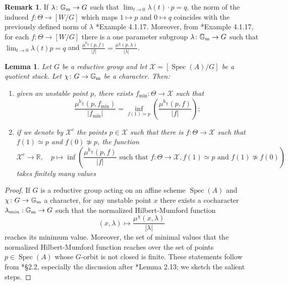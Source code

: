 \documentclass{amsart}
\newcommand{\bG}{\mathbb{G}}
\newcommand{\cX}{\mathcal{X}}
\newcommand{\spec}{\operatorname{Spec}}
\newcommand{\Gm}{\bG_{{\rm m}}}
\newtheorem{Lemma}[theorem]{Lemma}
\theoremstyle{definition}
\newtheorem{Remark}[theorem]{Remark}
\theoremstyle{definition}
\begin{document}
{\begin{Remark}\label{remark_norm_on_maps_from_theta_has_same_info_as_norm_from_1ps}
    If $\lambda\colon \Gm \to G$ such that $\lim_{t\to 0}\lambda(t)\cdot p=q$, the norm of the induced $f\colon\Theta\to [W/G]$ which maps $1\mapsto p$ and $0\mapsto q$ coincides with the previously defined norm of $\lambda$ \cite{HalInst}*{Example 4.1.17}. Moreover, from \cite{HalInst}*{Example 4.1.17}, for each $f\colon\Theta\to [W/G]$ there is a one parameter subgroup $\lambda\colon\Gm\to G$ such that $\lim_{t\to 0}\lambda(t)p = q$ and $\frac{\mu^{\Bbbk_\chi}(p,f)}{|f|} = \frac{\mu^{\chi}(p,\lambda)}{|\lambda|}$.
\end{Remark} 
 \begin{Lemma}\label{lm:bounded}
     Let $G$ be a reductive group and let $\cX=[\spec(A)/G]$ be a quotient stack. Let $\chi\colon G\to \Gm$ be a character.
     Then:
     \begin{enumerate}
         \item given an unstable point $p$, there exists $f_{\min}\colon\Theta\to\cX$ such that
         \[\frac{\mu^{\Bbbk_\chi}(p,f_{\min})}{|f_{\min}|} = \inf_{f(1)\simeq p} \left(\frac{\mu^{\Bbbk_\chi}(p,f)}{|f|}\right);\]
         \item  if we denote by $\cX^c$ the points $p\in \cX$ such that there is $f:\Theta\to \cX$ such that $f(1)\simeq p$ and $f(0)\not \simeq p$, the function \[\cX^c\to \mathbb{R},\quad p\mapsto \inf\left(\frac{\mu^{\Bbbk_\chi}(p,f)}{|f|}\text{ such that } f:\Theta\to \cX, f(1)\simeq p\text{ and }f(1)\not \simeq f(0)\right)\] takes finitely many values
     \end{enumerate}
 \end{Lemma}
 \begin{proof}
     If $G$ is a reductive group acting on an affine scheme $\spec(A)$ and $\chi\colon G\to\Gm$ a character, for any unstable point $x$ there exists a cocharacter $\lambda_{min}:\Gm\to G$ such that the normalized Hilbert-Mumford function
    \[ (x,\lambda) \longmapsto \frac{\mu^{\chi}(x,\lambda)}{|\lambda|} \]
    reaches its minimum value.
    Moreover, the set of minimal values that the normalized Hilbert-Mumford function reaches over the set of points $p\in \spec(A)$ whose $G$-orbit is not closed is finite. These statements follow from \cite{Hos}*{\S 2.2}, especially the discussion after \cite{Hos}*{Lemma 2.13}; we sketch the salient steps. 
    

\end{proof}}
\end{document}
